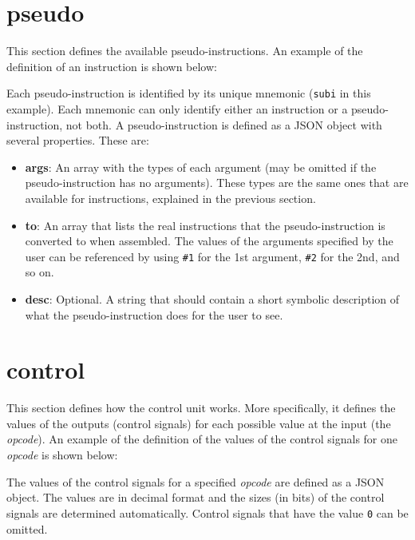 \documentclass[11pt,a4paper,twoside,titlepage]{report}
\begin{document}
\section{pseudo}

This section defines the available pseudo-instructions.
An example of the definition of an instruction is shown below:



Each pseudo-instruction is identified by its unique mnemonic (\verb+subi+ 
in this example). Each mnemonic can only identify either an instruction or a
pseudo-instruction, not both.
A pseudo-instruction is defined as a JSON object with several properties. 
These are:

\begin{itemize}
	\item \textbf{args}: An array with the types of each argument (may be omitted if
		the pseudo-instruction has no arguments). These types are the same ones that are
		available for instructions, explained in the previous section.
	\item \textbf{to}: An array that lists the real instructions that the
		pseudo-instruction is converted to when assembled. The values of the arguments
		specified by the user can be referenced by using \verb+#1+ for the 1st argument,
		\verb+#2+ for the 2nd, and so on.
	\item \textbf{desc}: Optional. A string that should contain a short symbolic
		description of what the pseudo-instruction does for the user to see.
\end{itemize}


\section{control}

This section defines how the control unit works. More specifically, it
defines the values of the outputs (control signals) for each possible value at
the input (the \emph{opcode}).
An example of the definition of the values of the control signals for one
\emph{opcode} is shown below:



The values of the control signals for a specified \emph{opcode} are defined as
a JSON object. The values are in decimal format and the sizes (in bits) of the 
control signals are determined automatically.
Control signals that have the value \verb+0+ can be omitted.
\end{document}
